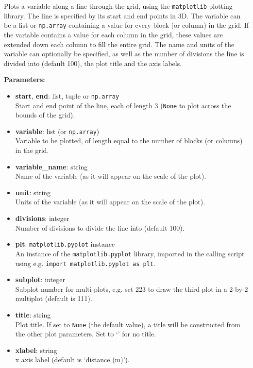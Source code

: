 Plots a variable along a line through the grid, using the \texttt{matplotlib} plotting library. The line is specified by its start and end points in 3D.  The variable can be a list or \texttt{np.array} containing a value for every block (or column) in the grid.  If the variable contains a value for each column in the grid, these values are extended down each column to fill the entire grid.  The name and units of the variable can optionally be specified, as well as the number of divisions the line is divided into (default 100), the plot title and the axis labels.

\textbf{Parameters:}
\begin{itemize}
\item \textbf{start}, \textbf{end}: list, tuple or \texttt{np.array}\\
  Start and end point of the line, each of length 3 (\texttt{None} to plot across the bounds of the grid).
\item \textbf{variable}: list (or \texttt{np.array})\\
  Variable to be plotted, of length equal to the number of blocks (or columns) in the grid.
\item \textbf{variable\_name}: string\\
  Name of the variable (as it will appear on the scale of the plot).
\item \textbf{unit}: string\\
  Units of the variable (as it will appear on the scale of the plot).
\item \textbf{divisions}: integer\\
  Number of divisions to divide the line into (default 100).
\item \textbf{plt}: \texttt{matplotlib.pyplot} instance\\
  An instance of the \texttt{matplotlib.pyplot} library, imported in the calling script using e.g. \texttt{import matplotlib.pyplot as plt}.
\item \textbf{subplot}: integer\\
  Subplot number for multi-plots, e.g. set 223 to draw the third plot in a 2-by-2 multiplot (default is 111).
\item \textbf{title}: string\\
  Plot title.  If set to \texttt{None} (the default value), a title will be constructed from the other plot parameters.  Set to `' for no title.
\item \textbf{xlabel}: string\\
  x axis label (default is `distance (m)').
\end{itemize}

